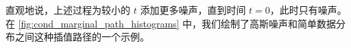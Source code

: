 \begin{examplebox}
直观地说，上述过程为较小的 $t$ 添加更多噪声，直到时间 $t=0$，此时只有噪声。在 \cref{fig:cond_marginal_path_histograms} 中，我们绘制了高斯噪声和简单数据分布之间这种插值路径的一个示例。
\end{examplebox}



